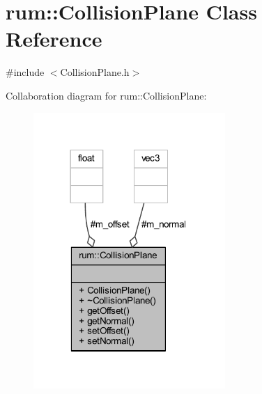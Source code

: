 \hypertarget{classrum_1_1_collision_plane}{}\section{rum\+:\+:Collision\+Plane Class Reference}
\label{classrum_1_1_collision_plane}


{\ttfamily \#include $<$Collision\+Plane.\+h$>$}



Collaboration diagram for rum\+:\+:Collision\+Plane\+:\nopagebreak
\begin{figure}[H]
\begin{center}
\leavevmode
\includegraphics[width=206pt]{classrum_1_1_collision_plane__coll__graph}
\end{center}
\end{figure}
